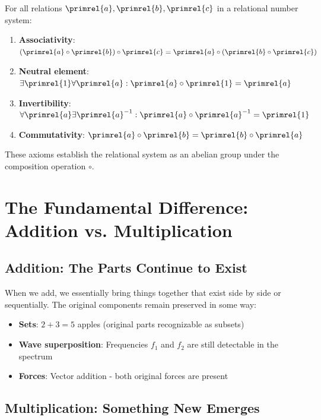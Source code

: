 	\begin{axiom}
		For all relations $\primrel{a}, \primrel{b}, \primrel{c}$ in a relational number system:
		\begin{enumerate}
			\item \textbf{Associativity}: $(\primrel{a} \circ \primrel{b}) \circ \primrel{c} = \primrel{a} \circ (\primrel{b} \circ \primrel{c})$
			\item \textbf{Neutral element}: $\exists \primrel{1} \forall \primrel{a}: \primrel{a} \circ \primrel{1} = \primrel{a}$
			\item \textbf{Invertibility}: $\forall \primrel{a} \exists \primrel{a}^{-1}: \primrel{a} \circ \primrel{a}^{-1} = \primrel{1}$
			\item \textbf{Commutativity}: $\primrel{a} \circ \primrel{b} = \primrel{b} \circ \primrel{a}$
		\end{enumerate}
	\end{axiom}
	
	These axioms establish the relational system as an abelian group under the composition operation $\circ$.
	
	\section{The Fundamental Difference: Addition vs. Multiplication}
	
	\subsection{Addition: The Parts Continue to Exist}
	
	When we add, we essentially bring things together that exist side by side or sequentially. The original components remain preserved in some way:
	
	\begin{itemize}
		\item \textbf{Sets}: $2 + 3 = 5$ apples (original parts recognizable as subsets)
		\item \textbf{Wave superposition}: Frequencies $f_1$ and $f_2$ are still detectable in the spectrum
		\item \textbf{Forces}: Vector addition - both original forces are present
	\end{itemize}
	
	\subsection{Multiplication: Something New Emerges}
	
